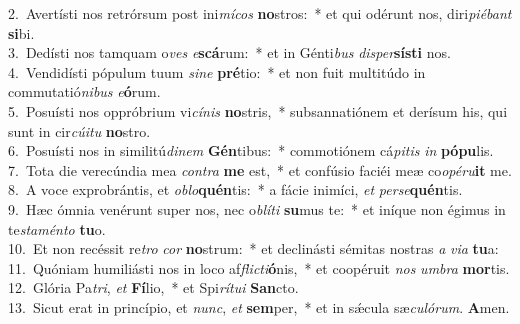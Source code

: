 {2.~}Avertísti nos retrórsum post ini\textit{mí}\textit{cos} \textbf{no}stros:~* et qui odérunt nos, diri\textit{pi}\textit{é}\textit{bant} \textbf{si}bi.\\
{3.~}Dedísti nos tamquam o\textit{ves} \textit{e}\textbf{scá}rum:~* et in Génti\textit{bus} \textit{di}\textit{sper}\textbf{sí}\textbf{sti} nos.\\
{4.~}Vendidísti pópulum tuum \textit{si}\textit{ne} \textbf{pré}tio:~* et non fuit multitúdo in commutatió\textit{ni}\textit{bus} \textit{e}\textbf{ó}rum.\\
{5.~}Posuísti nos oppróbrium vi\textit{cí}\textit{nis} \textbf{no}stris,~* subsannatiónem et derísum his, qui sunt in cir\textit{cú}\textit{i}\textit{tu} \textbf{no}stro.\\
{6.~}Posuísti nos in similitú\textit{di}\textit{nem} \textbf{Gén}tibus:~* commotiónem cá\textit{pi}\textit{tis} \textit{in} \textbf{pó}\textbf{pu}lis.\\
{7.~}Tota die verecúndia mea \textit{con}\textit{tra} \textbf{me} est,~* et confúsio faciéi meæ co\textit{o}\textit{pé}\textit{ru}\textbf{it} me.\\
{8.~}A voce exprobrántis, et \textit{o}\textit{blo}\textbf{quén}tis:~* a fácie inimíci, \textit{et} \textit{per}\textit{se}\textbf{quén}tis.\\
{9.~}Hæc ómnia venérunt super nos, nec o\textit{blí}\textit{ti} \textbf{su}mus te:~* et iníque non égimus in te\textit{sta}\textit{mén}\textit{to} \textbf{tu}o.\\
{10.~}Et non recéssit re\textit{tro} \textit{cor} \textbf{no}strum:~* et declinásti sémitas nostras \textit{a} \textit{vi}\textit{a} \textbf{tu}a:\\
{11.~}Quóniam humiliásti nos in loco af\textit{fli}\textit{cti}\textbf{ó}nis,~* et coopéruit \textit{nos} \textit{um}\textit{bra} \textbf{mor}tis.\\
{12.~}Glória Pa\textit{tri}, \textit{et} \textbf{Fí}lio,~* et Spi\textit{rí}\textit{tu}\textit{i} \textbf{San}cto.\\
{13.~}Sicut erat in princípio, et \textit{nunc}, \textit{et} \textbf{sem}per,~* et in sǽcula sæ\textit{cu}\textit{ló}\textit{rum}. \textbf{A}men.\\
